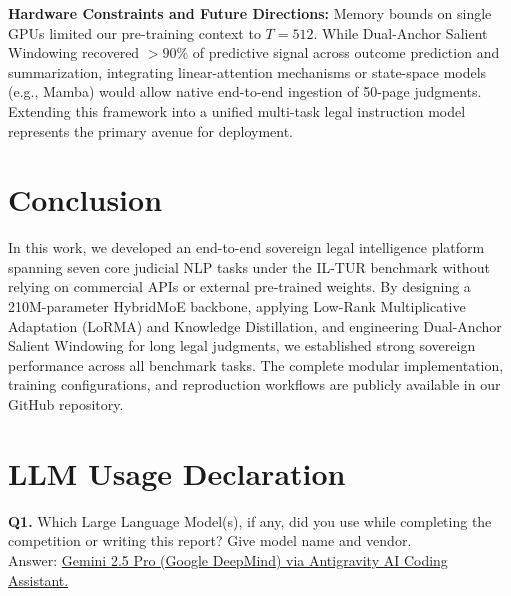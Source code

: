\documentclass[11pt, oneside]{article}
\begin{document}
\medskip
\noindent
\textbf{Hardware Constraints and Future Directions:} Memory bounds on single GPUs limited our pre-training context to $T=512$. While Dual-Anchor Salient Windowing recovered $>90\%$ of predictive signal across outcome prediction and summarization, integrating linear-attention mechanisms or state-space models (e.g., Mamba) would allow native end-to-end ingestion of 50-page judgments. Extending this framework into a unified multi-task legal instruction model represents the primary avenue for deployment.

\section{Conclusion}
\noindent
In this work, we developed an end-to-end sovereign legal intelligence platform spanning seven core judicial NLP tasks under the IL-TUR benchmark without relying on commercial APIs or external pre-trained weights. By designing a 210M-parameter HybridMoE backbone, applying Low-Rank Multiplicative Adaptation (LoRMA) and Knowledge Distillation, and engineering Dual-Anchor Salient Windowing for long legal judgments, we established strong sovereign performance across all benchmark tasks. The complete modular implementation, training configurations, and reproduction workflows are publicly available in our GitHub repository.

\section*{LLM Usage Declaration}
\noindent
\textbf{Q1.} Which Large Language Model(s), if any, did you use while completing the competition or writing this report? Give model name and vendor. \\[0.4em]
Answer: \underline{Gemini 2.5 Pro (Google DeepMind) via Antigravity AI Coding Assistant.}
\medskip
\end{document}
